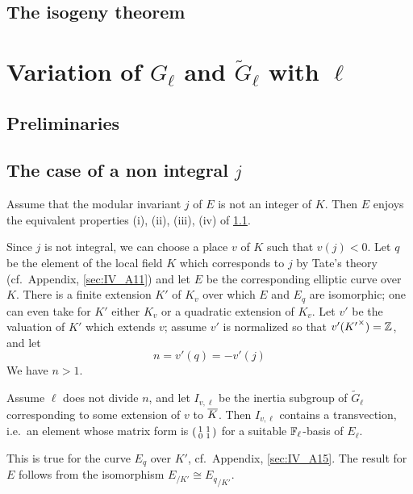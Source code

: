 \subsection{The isogeny theorem}
\label{sec:IV_23}

\section{Variation of \texorpdfstring{$G_\ell$}{Gℓ} and
\texorpdfstring{$\widetilde{G}_\ell$}{Ḡℓ} with \texorpdfstring{$\ell$}{ℓ}}

\subsection{Preliminaries}
\label{sec:IV_31}

\subsection{The case of a non integral $j$}
\label{sec:IV_32}
\dpage
\begin{thm}
	Assume that the modular invariant $j$ of $E$ is not an integer of $K$.
	Then $E$ enjoys the equivalent properties (i), (ii), (iii), (iv) of
	\ref{sec:IV_31}.
\end{thm}
Since $j$ is not integral, we can choose a place $v$ of $K$ such
that $v(j) < 0$. Let $q$ be the element of the local field $K$ which
corresponds to $j$ by Tate's theory (cf.\ Appendix, \ref{sec:IV_A11}) and let $E$
be the corresponding elliptic curve over $K$. There is a finite
extension $K'$ of $K_v$ over which $E$ and $E_q$ are isomorphic; one
can even take for $K'$ either $K_v$ or a quadratic extension of $K_v$.
Let $v'$ be the valuation of $K'$ which extends $v$; assume $v'$ is
normalized so that $v'({K'}^\times) = \mathbb{Z}$, and let
\[
	n = v'(q) = - v'(j)
\]
We have $n > 1$.

\begin{lem}\label{lem:IV_32_1}
	Assume $\ell$ does not divide $n$, and let $I_{v, \ell}$ be the inertia
	subgroup of $\widetilde{G}_\ell$ corresponding to some extension of $v$
	to $\overline{K}$.  Then $I_{v, \ell}$ contains a transvection, i.e.\ an
	element whose matrix form is $
	\begin{psmallmatrix}
		1 & 1 \\
		0 & 1
	\end{psmallmatrix}
	$ for a suitable $\mathbb{F}_\ell$-basis of $E_\ell$.
\end{lem}
This is true for the curve $E_q$ over $K'$, cf.\ Appendix, \ref{sec:IV_A15}.
The result for $E$ follows from the isomorphism $E_{/K'} \cong {E_q}_{/K'}$.

